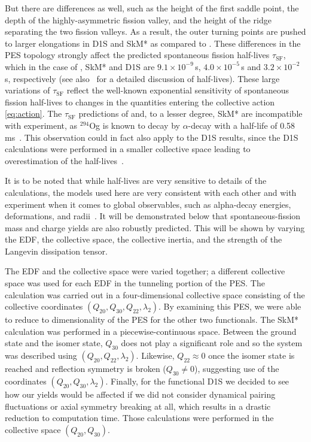 But there are differences as well, such as the height of the first saddle point, the depth of the highly-asymmetric fission valley, and the height of the ridge separating the two fission valleys. As a result, the outer turning points are pushed to larger elongations in D1S and SkM* as compared to \hfb{}. These differences in the PES topology strongly affect the predicted spontaneous fission half-lives $\tau_\mathrm{SF}$, which in the case of \hfb{}, SkM* and D1S are $9.1\times10^{-9}\,$s, $4.0\times10^{-5}\,$s and $3.2\times10^{-2}\,$s, respectively (see also~\cite{Staszczak2013,Baran2015} for a detailed discussion of half-lives). These large variations of $\tau_\mathrm{SF}$ reflect the well-known exponential sensitivity of spontaneous fission half-lives to changes in the quantities entering the collective action \eqref{eq:action}. The $\tau_\mathrm{SF}$ predictions of \hfb{} and, to a lesser degree,  SkM* are incompatible with experiment, as $^{294}$Og  is known to  decay by $\alpha$-decay with a half-life of 0.58\,ms~\cite{Brewer2018}. This observation could in fact also apply to the D1S results, since the D1S calculations were performed in a smaller collective space leading to overestimation of the half-lives~\cite{Giuliani2014,Sadhukhan2014}.

It is to be noted that while half-lives are very sensitive to details of the calculations, the models used here are very consistent with each other and with experiment when it comes to global observables, such as alpha-decay energies, deformations, and radii~\cite{Heenen2015,Giuliani2019}. It will be demonstrated below that spontaneous-fission mass and charge yields are also robustly predicted. This will be shown by varying the EDF, the collective space, the collective inertia, and the strength of the Langevin dissipation tensor.

The EDF and the collective space were varied together; a different collective space was used for each EDF in the tunneling portion of the PES. The {\hfb} calculation was carried out in a four-dimensional collective space consisting of the collective coordinates $(Q_{20}, Q_{30}, Q_{22}, \lambda_2)$. By examining this PES, we were able to reduce to dimensionality of the PES for the other two functionals. The SkM* calculation was performed in a piecewise-continuous space. Between the ground state and the isomer state, $Q_{30}$ does not play a significant role and so the system was described using  $(Q_{20}, Q_{22}, \lambda_2)$. Likewise, $Q_{22} \approx 0$ once the isomer state is reached and reflection symmetry is broken ($Q_{30} \neq 0$), suggesting use of the coordinates  $(Q_{20}, Q_{30}, \lambda_2)$. Finally, for the functional D1S we decided to see how our yields would be affected if we did not consider dynamical pairing fluctuations or axial symmetry breaking at all, which results in a drastic reduction to computation time. Those calculations were performed in the collective space $(Q_{20}, Q_{30})$.


